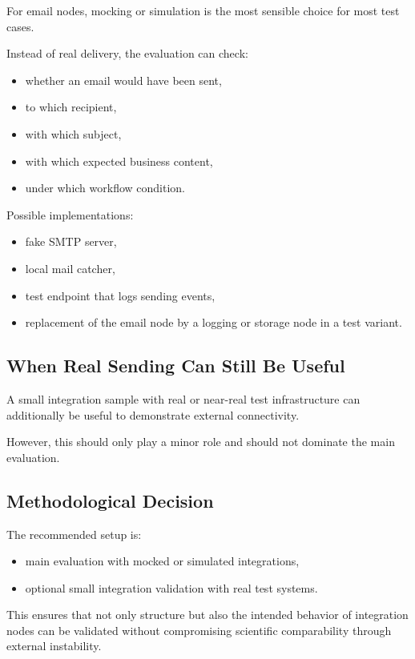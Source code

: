 \documentclass[12pt,a4paper]{article}
\begin{document}
For email nodes, mocking or simulation is the most sensible choice for most test cases.

Instead of real delivery, the evaluation can check:

\begin{itemize}
  \item whether an email would have been sent,
  \item to which recipient,
  \item with which subject,
  \item with which expected business content,
  \item under which workflow condition.
\end{itemize}

Possible implementations:

\begin{itemize}
  \item fake SMTP server,
  \item local mail catcher,
  \item test endpoint that logs sending events,
  \item replacement of the email node by a logging or storage node in a test variant.
\end{itemize}

\subsection{When Real Sending Can Still Be Useful}

A small integration sample with real or near-real test infrastructure can additionally be useful to demonstrate external connectivity.

However, this should only play a minor role and should not dominate the main evaluation.

\subsection{Methodological Decision}

The recommended setup is:

\begin{itemize}
  \item main evaluation with mocked or simulated integrations,
  \item optional small integration validation with real test systems.
\end{itemize}

This ensures that not only structure but also the intended behavior of integration nodes can be validated without compromising scientific comparability through external instability.
\end{document}
